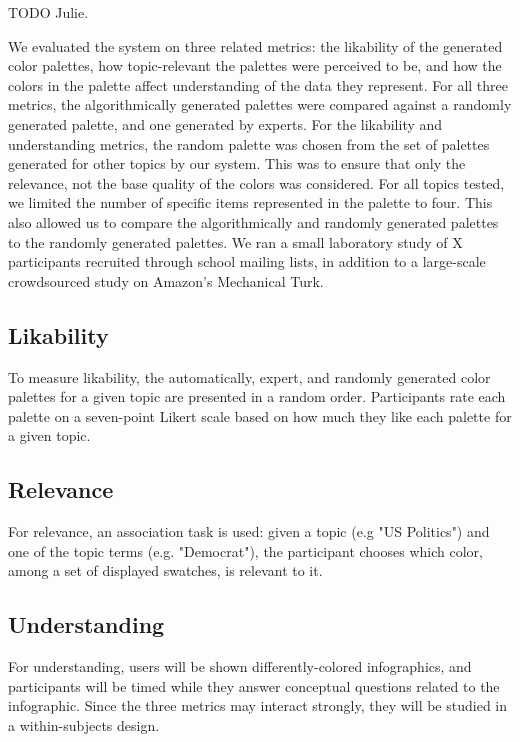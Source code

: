 TODO Julie.

We evaluated the system on three related metrics: the likability of the generated color palettes, how topic-relevant the palettes were perceived to be, and how the colors in the palette affect understanding of the data they represent. For all three metrics, the algorithmically generated palettes were compared against a randomly generated palette, and one generated by experts. For the likability and understanding metrics, the random palette was chosen from the set of palettes generated for other topics by our system. This was to ensure that only the relevance, not the base quality of the colors was considered. For all topics tested, we limited the number of specific items represented in the palette to four. This also allowed us to compare the algorithmically and randomly generated palettes to the randomly generated palettes. We ran a small laboratory study of X participants recruited through school mailing lists, in addition to a large-scale crowdsourced study on Amazon's Mechanical Turk. 

\subsection{Likability}
To measure likability, the automatically, expert, and randomly generated color palettes for a given topic are presented in a random order. Participants rate each palette on a seven-point Likert scale based on how much they like each palette for a given topic. 

\subsection{Relevance}
For relevance, an association task is used: given a topic (e.g "US Politics") and one of the topic terms (e.g. "Democrat"), the participant chooses which color, among a set of displayed swatches, is relevant to it.

\subsection{Understanding}
For understanding, users will be shown differently-colored infographics, and participants will be timed while they answer conceptual questions related to the infographic. Since the three metrics may interact strongly, they will be studied in a within-subjects design.